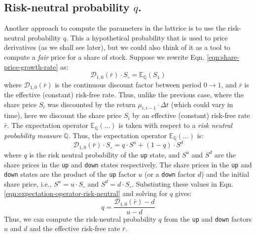 \documentclass[11pt]{article}
\theoremstyle{definition}
\begin{document}
\subsection*{Risk-neutral probability $q$.}
Another approach to compute the parameters in the lattrice is to use the risk-neutral probability $q$. 
This a hypothetical probability that is used to price derivatives (as we shall see later), 
but we could also think of it as a tool to compute a \textit{fair} price for a share of stock.
Suppose we rewrite Eqn. \eqref{eqn:share-price-growth-rate} as:
\begin{equation*}
    \mathcal{D}_{1,0}(\bar{r})\cdot{S_{\circ}} = \mathbb{E}_{\mathbb{Q}}\left(S_{1}\right)
\end{equation*}
where $\mathcal{D}_{1,0}(\bar{r})$ is the continuous discount factor between period $0\rightarrow{1}$, 
and $\bar{r}$ is the effective (constant) risk-free rate. Thus, unlike the previous case, where the share price $S_{i}$ was discounted by the
return $\mu_{i,i-1}\cdot\Delta{t}$ (which could vary in time), here we discount the share price $S_{i}$ by an effective (constant) risk-free rate $\bar{r}$.
The expectation operator $\mathbb{E}_{\mathbb{Q}}(\dots)$ is taken with respect to a \textit{risk neutral probability measure} $\mathbb{Q}$.
Thus, the expectation operator $\mathbb{E}_{\mathbb{Q}}(\dots)$ is:
\begin{equation}\label{eqn:expectation-operator-risk-neutral}
\mathcal{D}_{1,0}(\bar{r})\cdot{S_{\circ}} = q\cdot{S^{u}} + (1-q)\cdot{S^{d}}
\end{equation}
where $q$ is the risk neutral probability of the \texttt{up} state, and $S^{u}$ and $S^{d}$ are the share prices in the \texttt{up} and \texttt{down} states respectively.
The share prices in the \texttt{up} and \texttt{down} states are the product of the \texttt{up} factor $u$ (or a \texttt{down} factor $d$) and the initial share price, 
i.e., $S^{u} = u\cdot{S_{\circ}}$ and $S^{d} = d\cdot{S_{\circ}}$. Substiuting these values in Eqn. \eqref{eqn:expectation-operator-risk-neutral} and solving for $q$ gives:
\begin{equation*}
q = \frac{\mathcal{D}_{1,0}(\bar{r}) - d}{u - d}
\end{equation*}
Thus, we can compute the risk-neutral probability $q$ from the \texttt{up} and \texttt{down} factors $u$ and $d$ and the effective risk-free rate $\bar{r}$.
\clearpage
\printindex
\end{document}

